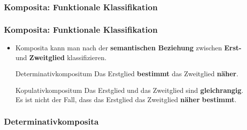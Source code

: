 \subsubsection{Komposita: Funktionale Klassifikation}


\begin{frame}
\frametitle{Komposita: Funktionale Klassifikation}

\begin{itemize}
	\item Komposita kann man nach der \textbf{semantischen Beziehung} zwischen \textbf{Erst-} und \textbf{Zweitglied} klassifizieren.
	
	\begin{block}{Determinativkompositum}
		Das Erstglied \textbf{bestimmt} das Zweitglied \textbf{näher}. 
	\end{block}
	
	\settowidth{}

	 
	
	\z 

\pause 
	
	\begin{block}{Kopulativkompositum}
		Das Erstglied und das Zweitglied sind \textbf{gleichrangig}.\\
		Es ist nicht der Fall, dass das Erstglied  das Zweitglied \textbf{näher} \textbf{bestimmt}. 
	\end{block}
	
	 
	\z 
	
\end{itemize}

\end{frame}


\subsubsection{Determinativkomposita}

